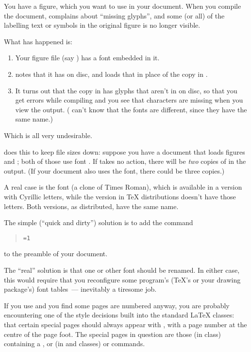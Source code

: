 
You have a  figure, which you want to use in your
\PDFLaTeX{} document.  When you compile the document, \PDFTeX{}
complains about ``missing glyphs'', and some (or all) of the labelling
text or symbols in the original figure is no longer visible.

What has happened is:
\begin{enumerate}
\item Your figure file (say ) has a font 
  embedded in it.
\item \PDFTeX{} notes that it has  on disc, and loads
  that in place of the copy in .
\item It turns out that the copy in  has glyphs that
  aren't in  on disc, so that you get errors while
  compiling and you see that characters are missing when you view the
  output.  (\PDFTeX{} can't know that the fonts are different, since
  they have the same name.)
\end{enumerate}
Which is all very undesirable.

\PDFTeX{} does this to keep file sizes down: suppose you have a
document that loads figures  and ; both
of those use font .  If \PDFTeX{} takes no action,
there will be \emph{two} copies of  in the output.
(If your document also uses the font, there could be three copies.)

A real case is the  font  (a clone
of Times Roman), which is available in a version with Cyrillic
letters, while the version in \TeX{} distributions doesn't have those
letters.  Both versions, as distributed, have the same name.

The simple (``quick and dirty'') solution is to add the command
\begin{quote}
  \texttt{=1}
\end{quote}
to the preamble of your document.

The ``real'' solution is that one or other font should be renamed.  In
either case, this would require that you reconfigure some program's
(\TeX{}'s or your drawing package's) font tables~--- inevitably a
tiresome job.


If you use  and you find some pages are
numbered anyway, you are probably encountering one of the style
decisions built into the standard \LaTeX{} classes: that certain
special pages should always appear with ,
with a page number at the centre of the page foot.  The special pages
in question are those (in  class) containing a
, or (in  and  classes)
 or  commands.

